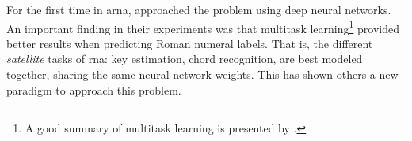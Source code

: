 

For the first time in \gls{arna},
\textcite{chen2018functional} approached the problem using
deep neural networks. An important finding in their
experiments was that multitask learning\footnote{A good
summary of multitask learning is presented by
\textcite{ruder2017overview}.} provided better results when
predicting Roman numeral labels. That is, the different
\emph{satellite} tasks of \gls{rna}: key
estimation, chord recognition, are best modeled together,
sharing the same neural network weights. This has shown
others a new paradigm to approach this problem.
